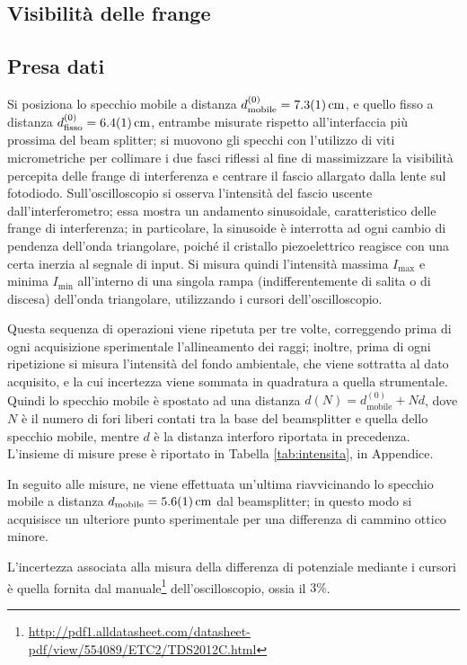 \documentclass[10pt,oneside,a4paper]{article}
\begin{document}
\begin{multicols}{2}
\section{Visibilità delle frange}
\subsection{Presa dati}
Si posiziona lo specchio mobile a distanza $d^{(0)}_\mathrm{mobile} = \SI{7.3 \pm 0.1}{cm}$, e quello fisso a distanza $d^{(0)}_\mathrm{fisso} = \SI{6.4 \pm 0.1}{cm}$, entrambe misurate rispetto all'interfaccia più prossima del beam splitter; si muovono gli specchi con l'utilizzo di viti micrometriche per collimare i due fasci riflessi al fine di massimizzare la visibilità percepita delle frange di interferenza e centrare il fascio allargato dalla lente sul fotodiodo. Sull'oscilloscopio si osserva l'intensità del fascio uscente dall'interferometro; essa mostra un andamento sinusoidale, caratteristico delle frange di interferenza; in particolare, la sinusoide è interrotta ad ogni cambio di pendenza dell'onda triangolare, poiché il cristallo piezoelettrico reagisce con una certa inerzia al segnale di input. Si misura quindi l'intensità massima $I_\mathrm{max}$ e minima $I_\mathrm{min}$ all'interno di una singola rampa (indifferentemente di salita o di discesa) dell'onda triangolare, utilizzando i cursori dell'oscilloscopio. 

Questa sequenza di operazioni viene ripetuta per tre volte, correggendo prima di ogni acquisizione sperimentale l'allineamento dei raggi; inoltre, prima di ogni ripetizione si misura l'intensità del fondo ambientale, che viene sottratta al dato acquisito, e la cui incertezza viene sommata in quadratura a quella strumentale. Quindi lo specchio mobile è spostato ad una distanza $d(N) = d^{(0)}_\mathrm{mobile} + Nd$, dove $N$ è il numero di fori liberi contati tra la base del beamsplitter e quella dello specchio mobile, mentre $d$ è la distanza interforo riportata in precedenza.
L'insieme di misure prese è riportato in Tabella \ref{tab:intensita}, in Appendice.

In seguito alle misure, ne viene effettuata un'ultima riavvicinando lo specchio mobile a distanza $d_\mathrm{mobile} = \SI{5.6 \pm 0.1}{cm}$ dal beamsplitter; in questo modo si acquisisce un ulteriore punto sperimentale per una differenza di cammino ottico minore.

L'incertezza associata alla misura della differenza di potenziale mediante i cursori è quella fornita dal manuale\footnote{\url{http://pdf1.alldatasheet.com/datasheet-pdf/view/554089/ETC2/TDS2012C.html}} dell'oscilloscopio, ossia il $3\%$.


\end{multicols}
\end{document}
